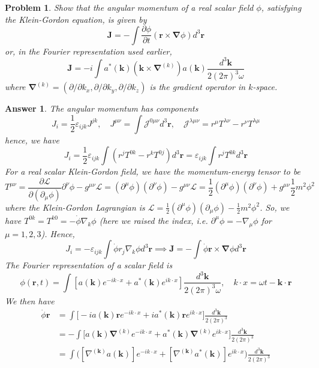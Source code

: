 \documentclass[a4paper]{article}
\newtheorem{ans}{Answer}[section]
\theoremstyle{new}
\newtheorem{qns}{Problem}[section]
\begin{document}
\newpage
\begin{qns}
Show that the angular momentum of a real scalar field $\phi$, satisfying the Klein-Gordon equation, is given by
$$\mathbf{J}=-\int\frac{\partial\phi}{\partial t}(\mathbf{r}\times\boldsymbol{\nabla}\phi)d^3\mathbf{r}$$
or, in the Fourier representation used earlier,
$$\mathbf{J}=-i\int a^*(\mathbf{k})(\mathbf{k}\times\boldsymbol{\nabla}^{(k)})a(\mathbf{k})\frac{d^3\mathbf{k}}{2(2\pi)^3\omega}$$
where $\boldsymbol{\nabla}^{(k)} = (\partial/\partial k_x, \partial/\partial k_y, \partial/\partial k_z)$ is the gradient operator in $k$-space.
\end{qns}
\begin{ans}
The angular momentum has components
$$J_i=\frac{1}{2}\varepsilon_{ijk}J^{jk},\quad J^{\mu\nu}=\int \mathcal{J}^{0\mu\nu}d^3\mathbf{r},\quad \mathcal{J}^{\lambda\mu\nu}=r^\mu T^{\lambda\nu}-r^\nu T^{\lambda\mu}$$
hence, we have
$$J_i=\frac{1}{2}\varepsilon_{ijk}\int(r^jT^{0k}-r^kT^{0j})d^3\mathbf{r}=\varepsilon_{ijk}\int r^jT^{0k}d^3\mathbf{r}$$
For a real scalar Klein-Gordon field, we have the momentum-energy tensor to be
$$T^{\mu\nu}=\frac{\partial\mathcal{L}}{\partial(\partial_\mu\phi)}\partial^\nu\phi-g^{\mu\nu}\mathcal{L}=(\partial^\mu\phi)(\partial^\nu\phi)-g^{\mu\nu}\mathcal{L}=\frac{1}{2}(\partial^\mu\phi)(\partial^\nu\phi)+g^{\mu\nu}\frac{1}{2}m^2\phi^2$$
where the Klein-Gordon Lagrangian is $\mathcal{L}=\frac{1}{2}(\partial^\mu\phi)(\partial_\mu\phi)-\frac{1}{2}m^2\phi^2$. So, we have $T^{0k}=T^{k0}=-\dot{\phi}\nabla_k\phi$ (here we raised the index, i.e. $\partial^\mu\phi=-\nabla_\mu\phi$ for $\mu=1,2,3$). Hence, 
$$J_i=-\varepsilon_{ijk}\int\dot{\phi}r_j\nabla_k\phi d^3\mathbf{r}\implies\mathbf{J}=-\int\dot{\phi}\mathbf{r}\times\boldsymbol{\nabla}\phi d^3\mathbf{r}$$
The Fourier representation of a scalar field is
$$\phi(\mathbf{r},t)=\int[a(\mathbf{k})e^{-ik\cdot x}+a^*(\mathbf{k})e^{ik\cdot x}]\frac{d^3\mathbf{k}}{2(2\pi)^3\omega},\quad k\cdot x=\omega t-\mathbf{k}\cdot\mathbf{r}$$
We then have
\begin{align}
    \dot{\phi}\mathbf{r}&=\int\bigg[-ia(\mathbf{k})\mathbf{r}e^{-ik\cdot x}+ia^*(\mathbf{k})\mathbf{r}e^{ik\cdot x}\bigg]\frac{d^3\mathbf{k}}{2(2\pi)^3}\nonumber\\&=-\int\bigg[a(\mathbf{k})\boldsymbol{\nabla}^{(k)}e^{-ik\cdot x}+a^*(\mathbf{k})\boldsymbol{\nabla}^{(k)}e^{ik\cdot x}\bigg]\frac{d^3\mathbf{k}}{2(2\pi)^3}\nonumber\\&=\int\bigg([\nabla^{(\mathbf{k})}a(\mathbf{k})]e^{-ik\cdot x}+[\nabla^{(\mathbf{k})}a^*(\mathbf{k})]e^{ik\cdot x}\bigg)\frac{d^3\mathbf{k}}{2(2\pi)^3}\nonumber

\end{align}
\end{ans}
\end{document}

